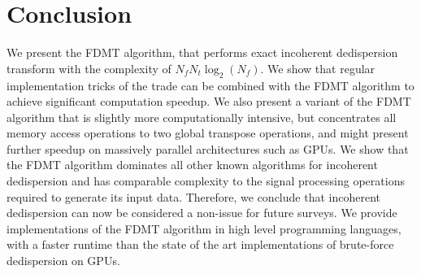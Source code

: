 \documentclass[iop]{emulateapj}
\begin{document}
%
%
%


\section{Conclusion}\label{sec:Conclusion}
We present the FDMT algorithm, that performs exact incoherent dedispersion transform with the complexity of $N_fN_t\log_2(N_f)$. We show that regular implementation tricks of the trade can be combined with the FDMT algorithm to achieve significant computation speedup. We also present a variant of the FDMT algorithm that is slightly more computationally intensive, but concentrates all memory access operations to two global transpose operations, and might present further speedup on massively parallel architectures such as GPUs.
We show that the FDMT algorithm dominates all other known algorithms for incoherent dedispersion and has comparable complexity to the signal processing operations required to generate its input data. Therefore, we conclude that incoherent dedispersion can now be considered a non-issue for future surveys.
We provide implementations of the FDMT algorithm in high level programming languages, with a faster runtime than the state of the art implementations of brute-force dedispersion on GPUs. 
\end{document}

